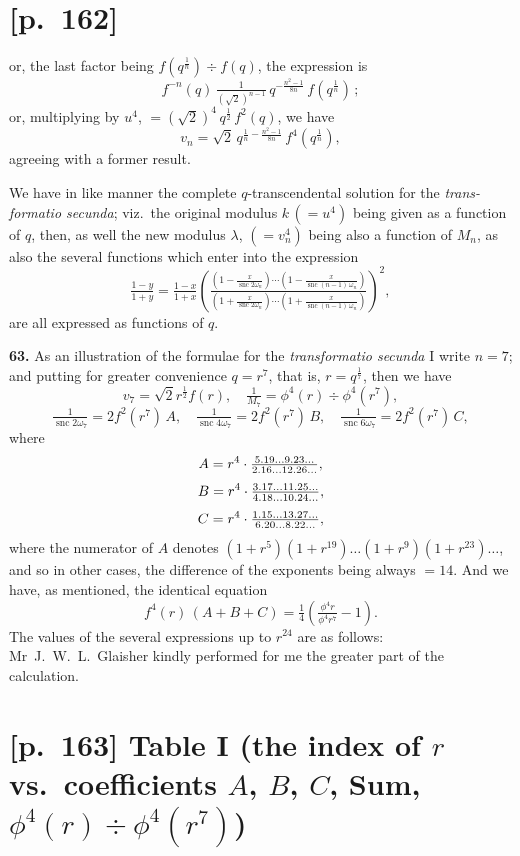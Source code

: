 \documentclass[11pt]{article}
\begin{document}
\section*{[p.~162]}
or, the last factor being $f(q^{\frac{1}{n}})\div f(q)$, the expression is
\[
f^{-n}(q)\,\tfrac{1}{(\sqrt{2})^{n-1}}\,q^{-\frac{n^2-1}{8n}}\,f(q^{\frac{1}{n}})\,;
\]
or, multiplying by $u^4$, $=(\sqrt{2})^4\,q^{\frac{1}{2}}\,f^{2}(q)$, we have
\[
v_n=\sqrt{2}\,q^{\frac{1}{n}-\frac{n^2-1}{8n}}\,f^{4}(q^{\frac{1}{n}}),
\]
agreeing with a former result.

We have in like manner the complete $q$-transcendental solution for the \textit{trans-
formatio secunda}; viz.\ the original modulus $k\,(=u^4)$ being given as a function of $q$,
then, as well the new modulus $\lambda$, $(=v_n^4)$ being also a function of $M_n$, as also the several
functions which enter into the expression
\[
\tfrac{1-y}{1+y}=\tfrac{1-x}{1+x}\!\left(\tfrac{\left(1-\tfrac{x}{\operatorname{snc}2\omega_n}\right)\cdots\!\left(1-\tfrac{x}{\operatorname{snc}(n-1)\,\omega_n}\right)}{\left(1+\tfrac{x}{\operatorname{snc}2\omega_n}\right)\cdots\!\left(1+\tfrac{x}{\operatorname{snc}(n-1)\,\omega_n}\right)}\right)^{\!2}\!,
\]
are all expressed as functions of $q$.

\medskip
\noindent\textbf{63.} As an illustration of the formulae for the \textit{transformatio secunda} I write $n=7$;
and putting for greater convenience $q=r^7$, that is, $r=q^{\frac{1}{7}}$, then we have
\[
v_7=\sqrt{2}r^{\frac{1}{2}}f(r),\quad \tfrac{1}{M_7}=\phi^4(r)\div\phi^4(r^7),
\]
\[
\tfrac{1}{\operatorname{snc}2\omega_7}=2f^2(r^7)\,A,\quad \tfrac{1}{\operatorname{snc}4\omega_7}=2f^2(r^7)\,B,\quad \tfrac{1}{\operatorname{snc}6\omega_7}=2f^2(r^7)\,C,
\]
where
\[
A=r^4\cdot \tfrac{5\ldotp 19\ldots 9\ldotp 23\ldots}{2\ldotp 16\ldots 12\ldotp 26\ldots},
\]
\[
B=r^4\cdot \tfrac{3\ldotp 17\ldots 11\ldotp 25\ldots}{4\ldotp 18\ldots 10\ldotp 24\ldots},
\]
\[
C=r^4\cdot \tfrac{1\ldotp 15\ldots 13\ldotp 27\ldots}{6\ldotp 20\ldots 8\ldotp 22\ldots},
\]
where the numerator of $A$ denotes $(1+r^5)(1+r^{19})\ldots(1+r^9)(1+r^{23})\ldots$, and so in other
cases, the difference of the exponents being always $=14$. And we have, as mentioned,
the identical equation
\[
f^4(r)\,(A+B+C)=\tfrac{1}{4}\!\left(\tfrac{\phi^4 r}{\phi^4 r^7}-1\right)\!.
\]
The values of the several expressions up to $r^{24}$ are as follows: Mr~J.~W.~L.~Glaisher
kindly performed for me the greater part of the calculation.

\section*{[p.~163] Table I (the index of $r$ vs.\ coefficients $A$, $B$, $C$, Sum, $\phi^4(r)\div\phi^4(r^7)$)}
\end{document}
